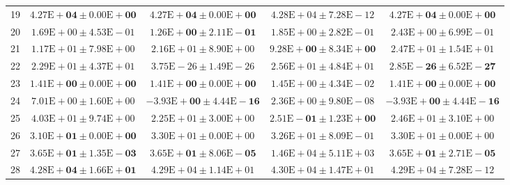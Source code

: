 \documentclass[conference]{IEEEtran}
\begin{document}
\begin{table}[!t]
\begin{tabular}{rcccc}
19 & $\bm{4.27\mathrm{E}{+}04 \pm 0.00\mathrm{E}{+}00}$ & $\bm{4.27\mathrm{E}{+}04 \pm 0.00\mathrm{E}{+}00}$ & $4.28\mathrm{E}{+}04 \pm 7.28\mathrm{E}{-}12$ & $\bm{4.27\mathrm{E}{+}04 \pm 0.00\mathrm{E}{+}00}$ \\
20 & $1.69\mathrm{E}{+}00 \pm 4.53\mathrm{E}{-}01$ & $\bm{1.26\mathrm{E}{+}00 \pm 2.11\mathrm{E}{-}01}$ & $1.85\mathrm{E}{+}00 \pm 2.82\mathrm{E}{-}01$ & $2.43\mathrm{E}{+}00 \pm 6.99\mathrm{E}{-}01$ \\
21 & $1.17\mathrm{E}{+}01 \pm 7.98\mathrm{E}{+}00$ & $2.16\mathrm{E}{+}01 \pm 8.90\mathrm{E}{+}00$ & $\bm{9.28\mathrm{E}{+}00 \pm 8.34\mathrm{E}{+}00}$ & $2.47\mathrm{E}{+}01 \pm 1.54\mathrm{E}{+}01$ \\
22 & $2.29\mathrm{E}{+}01 \pm 4.37\mathrm{E}{+}01$ & $3.75\mathrm{E}{-}26 \pm 1.49\mathrm{E}{-}26$ & $2.56\mathrm{E}{+}01 \pm 4.84\mathrm{E}{+}01$ & $\bm{2.85\mathrm{E}{-}26 \pm 6.52\mathrm{E}{-}27}$ \\
23 & $\bm{1.41\mathrm{E}{+}00 \pm 0.00\mathrm{E}{+}00}$ & $\bm{1.41\mathrm{E}{+}00 \pm 0.00\mathrm{E}{+}00}$ & $1.45\mathrm{E}{+}00 \pm 4.34\mathrm{E}{-}02$ & $\bm{1.41\mathrm{E}{+}00 \pm 0.00\mathrm{E}{+}00}$ \\
24 & $7.01\mathrm{E}{+}00 \pm 1.60\mathrm{E}{+}00$ & $\bm{-3.93\mathrm{E}{+}00 \pm 4.44\mathrm{E}{-}16}$ & $2.36\mathrm{E}{+}00 \pm 9.80\mathrm{E}{-}08$ & $\bm{-3.93\mathrm{E}{+}00 \pm 4.44\mathrm{E}{-}16}$ \\
25 & $4.03\mathrm{E}{+}01 \pm 9.74\mathrm{E}{+}00$ & $2.25\mathrm{E}{+}01 \pm 3.00\mathrm{E}{+}00$ & $\bm{2.51\mathrm{E}{-}01 \pm 1.23\mathrm{E}{+}00}$ & $2.46\mathrm{E}{+}01 \pm 3.10\mathrm{E}{+}00$ \\
26 & $\bm{3.10\mathrm{E}{+}01 \pm 0.00\mathrm{E}{+}00}$ & $3.30\mathrm{E}{+}01 \pm 0.00\mathrm{E}{+}00$ & $3.26\mathrm{E}{+}01 \pm 8.09\mathrm{E}{-}01$ & $3.30\mathrm{E}{+}01 \pm 0.00\mathrm{E}{+}00$ \\
27 & $\bm{3.65\mathrm{E}{+}01 \pm 1.35\mathrm{E}{-}03}$ & $\bm{3.65\mathrm{E}{+}01 \pm 8.06\mathrm{E}{-}05}$ & $1.46\mathrm{E}{+}04 \pm 5.11\mathrm{E}{+}03$ & $\bm{3.65\mathrm{E}{+}01 \pm 2.71\mathrm{E}{-}05}$ \\
28 & $\bm{4.28\mathrm{E}{+}04 \pm 1.66\mathrm{E}{+}01}$ & $4.29\mathrm{E}{+}04 \pm 1.14\mathrm{E}{+}01$ & $4.30\mathrm{E}{+}04 \pm 1.47\mathrm{E}{+}01$ & $4.29\mathrm{E}{+}04 \pm 7.28\mathrm{E}{-}12$ \\
\bottomrule
\end{tabular}
\end{table}
\end{document}
